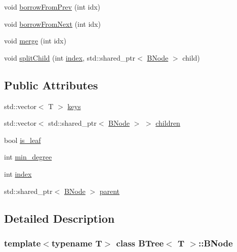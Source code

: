 \begin{DoxyCompactItemize}
\item 
void \hyperlink{classBTree_1_1BNode_a1ee99a5c0649e19e8a34934ff8dba85b}{borrow\+From\+Prev} (int idx)
\item 
void \hyperlink{classBTree_1_1BNode_acda705e13267fdedbfd27f017668a9bf}{borrow\+From\+Next} (int idx)
\item 
void \hyperlink{classBTree_1_1BNode_ac3caae8aac87f7bdce9960a658f9ad87}{merge} (int idx)
\item 
void \hyperlink{classBTree_1_1BNode_a0b356b6ac1ec3d8e0cbfb68d9e5f7582}{split\+Child} (int \hyperlink{classBTree_1_1BNode_a9b057ee85c9a950709afaee727515fab}{index}, std\+::shared\+\_\+ptr$<$ \hyperlink{classBTree_1_1BNode}{B\+Node} $>$ child)
\end{DoxyCompactItemize}
\subsection*{Public Attributes}
\begin{DoxyCompactItemize}
\item 
std\+::vector$<$ T $>$ \hyperlink{classBTree_1_1BNode_a5fb27046a502d2a28fc539042a1bfd87}{keys}
\item 
std\+::vector$<$ std\+::shared\+\_\+ptr$<$ \hyperlink{classBTree_1_1BNode}{B\+Node} $>$ $>$ \hyperlink{classBTree_1_1BNode_a3683e8ef7010edede627bdacb9d40025}{children}
\item 
bool \hyperlink{classBTree_1_1BNode_aeea14a23dfc45f162ecbbc736b24014a}{is\+\_\+leaf}
\item 
int \hyperlink{classBTree_1_1BNode_a9a108839cbc75c2c207d97140577bd7c}{min\+\_\+degree}
\item 
int \hyperlink{classBTree_1_1BNode_a9b057ee85c9a950709afaee727515fab}{index}
\item 
std\+::shared\+\_\+ptr$<$ \hyperlink{classBTree_1_1BNode}{B\+Node} $>$ \hyperlink{classBTree_1_1BNode_a5856f1fc1eb5e7e936d4deb50dc64a3c}{parent}
\end{DoxyCompactItemize}


\subsection{Detailed Description}
\subsubsection*{template$<$typename T$>$\newline
class B\+Tree$<$ T $>$\+::\+B\+Node}

